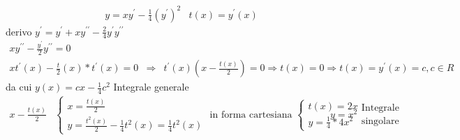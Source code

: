 \begin{enumerate}
\begin{esempio}
                  \begin{eqnarray*}
                    y=xy^\prime-\frac{1}{4}(y^\prime)^2 & t(x)=y^\prime(x)
                  \end{eqnarray*}
                  derivo $y^\prime=y^\prime+xy^{\prime\prime}-\frac{2}{4}y^\prime
                  y^{\prime\prime}$
                  \begin{eqnarray*}
                    xy^{\prime\prime}-\frac{y^\prime}{2}y^{\prime\prime}=0\\
                    xt^\prime (x)-\frac{t}{2}(x)*t^\prime(x)=0
                    &\Rightarrow&t^\prime(x)\left(x-\frac{t(x)}{2}\right)=0\Rightarrow
                                  t(x)=0\Rightarrow t(x)=y^\prime(x)=c, c\in R
                  \end{eqnarray*}
                  da cui $y(x)=cx-\frac{1}{4}c^2$ Integrale generale\\
                  \begin{eqnarray*}
                    x-\frac{t(x)}{2} & \begin{cases}
                                         x=\frac{t(x)}{2}\\
                                         y=\frac{t^2(x)}{2}-\frac{1}{4}t^2(x)=\frac{1}{4}t^2(x)
                                       \end{cases}
                                       \text{ in forma cartesiana } \begin{cases}
                                                                      t(x)=2x\\
                                                                      y=\frac{1}{4}*4x^2
                                                                    \end{cases}
                    & y=x^2   \begin{matrix}
                                \text{Integrale}\\
                                \text{singolare}
                              \end{matrix}
                  \end{eqnarray*}
                \end{esempio}
\end{enumerate}
\clearpage
